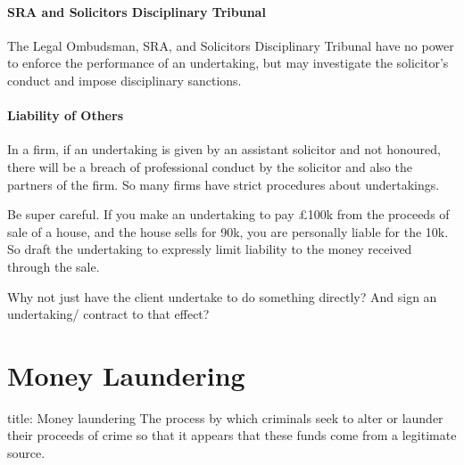 \documentclass[
]{article}
\newenvironment{Shaded}{}{}
\newcommand{\NormalTok}[1]{#1}
\begin{document}
\hypertarget{sra-and-solicitors-disciplinary-tribunal}{%
\paragraph{SRA and Solicitors Disciplinary
Tribunal}\label{sra-and-solicitors-disciplinary-tribunal}}

The Legal Ombudsman, SRA, and Solicitors Disciplinary Tribunal have no
power to enforce the performance of an undertaking, but may investigate
the solicitor's conduct and impose disciplinary sanctions.

\hypertarget{liability-of-others}{%
\paragraph{Liability of Others}\label{liability-of-others}}

In a firm, if an undertaking is given by an assistant solicitor and not
honoured, there will be a breach of professional conduct by the
solicitor and also the partners of the firm. So many firms have strict
procedures about undertakings.

\begin{Shaded}
\begin{Highlighting}[]
\NormalTok{Be super careful. If you make an undertaking to pay £100k from the proceeds of sale of a house, and the house sells for 90k, you are personally liable for the 10k. So draft the undertaking to expressly limit liability to the money received through the sale. }
\end{Highlighting}
\end{Shaded}

\begin{Shaded}
\begin{Highlighting}[]
\NormalTok{Why not just have the client undertake to do something directly? And sign an undertaking/ contract to that effect?}
\end{Highlighting}
\end{Shaded}

\hypertarget{money-laundering}{%
\section{Money Laundering}\label{money-laundering}}

\begin{Shaded}
\begin{Highlighting}[]
\NormalTok{title: Money laundering}
\NormalTok{The process by which criminals seek to alter or launder their proceeds of crime so that it appears that these funds come from a legitimate source. }
\end{Highlighting}
\end{Shaded}
\end{document}
